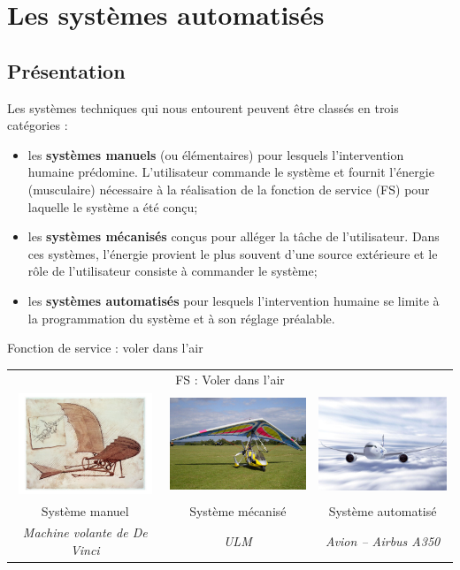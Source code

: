 \documentclass[10pt,fleqn]{article} %
\begin{document}
\section{Les systèmes automatisés}
\subsection{Présentation}


Les systèmes techniques qui nous entourent peuvent être classés en trois
catégories : 
\begin{itemize}
 \item les \textbf{systèmes manuels} (ou élémentaires) pour lesquels l'intervention humaine prédomine. L'utilisateur commande le système et fournit l'énergie (musculaire) nécessaire à la réalisation de la fonction de service (FS) pour laquelle le système a été conçu;
\item les \textbf{systèmes mécanisés} conçus pour alléger la tâche de l'utilisateur. 
Dans ces systèmes, l'énergie provient le plus souvent d'une source extérieure et le rôle de l'utilisateur consiste à commander le système;
\item les \textbf{systèmes automatisés} pour lesquels l'intervention humaine se
limite à la programmation du système et à son réglage préalable.
\end{itemize}


\begin{exemple}
  Fonction de service : voler dans l'air
  
  
\begin{center}
 \begin{tabular}{ccc}
  \multicolumn{3}{c}{FS : Voler dans l'air} \\
  \includegraphics[height=3cm]{images/machineLDV} &
  \includegraphics[height=3cm]{images/ulm} &
  \includegraphics[height=3cm]{images/a350} \\
  Système manuel & Système mécanisé & Système automatisé \\
  \textit{Machine volante de De Vinci} & \textit{ULM} & \textit{Avion -- Airbus
A350}
 \end{tabular}
\end{center}
\end{exemple}
\end{document}
